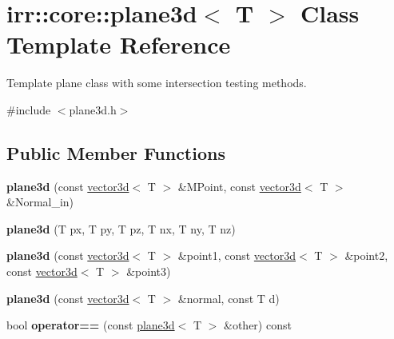\hypertarget{classirr_1_1core_1_1plane3d}{}\section{irr\+:\+:core\+:\+:plane3d$<$ T $>$ Class Template Reference}
\label{classirr_1_1core_1_1plane3d}


Template plane class with some intersection testing methods.  




{\ttfamily \#include $<$plane3d.\+h$>$}

\subsection*{Public Member Functions}
\begin{DoxyCompactItemize}
\item 
{\bfseries plane3d} (const \hyperlink{classirr_1_1core_1_1vector3d}{vector3d}$<$ T $>$ \&M\+Point, const \hyperlink{classirr_1_1core_1_1vector3d}{vector3d}$<$ T $>$ \&Normal\+\_\+in)\hypertarget{classirr_1_1core_1_1plane3d_a479bad81272248a153f9520be7b8da4c}{}\label{classirr_1_1core_1_1plane3d_a479bad81272248a153f9520be7b8da4c}

\item 
{\bfseries plane3d} (T px, T py, T pz, T nx, T ny, T nz)\hypertarget{classirr_1_1core_1_1plane3d_af754b386af5b0296a47d97f1c9e39d55}{}\label{classirr_1_1core_1_1plane3d_af754b386af5b0296a47d97f1c9e39d55}

\item 
{\bfseries plane3d} (const \hyperlink{classirr_1_1core_1_1vector3d}{vector3d}$<$ T $>$ \&point1, const \hyperlink{classirr_1_1core_1_1vector3d}{vector3d}$<$ T $>$ \&point2, const \hyperlink{classirr_1_1core_1_1vector3d}{vector3d}$<$ T $>$ \&point3)\hypertarget{classirr_1_1core_1_1plane3d_a79aa2659564f880e71db761516d91b9e}{}\label{classirr_1_1core_1_1plane3d_a79aa2659564f880e71db761516d91b9e}

\item 
{\bfseries plane3d} (const \hyperlink{classirr_1_1core_1_1vector3d}{vector3d}$<$ T $>$ \&normal, const T d)\hypertarget{classirr_1_1core_1_1plane3d_a3f3171c926e019c47e56e2eb0ba9a9bf}{}\label{classirr_1_1core_1_1plane3d_a3f3171c926e019c47e56e2eb0ba9a9bf}

\item 
bool {\bfseries operator==} (const \hyperlink{classirr_1_1core_1_1plane3d}{plane3d}$<$ T $>$ \&other) const \hypertarget{classirr_1_1core_1_1plane3d_a4ea013907b2e44c91cc9defacb7a8d53}{}\label{classirr_1_1core_1_1plane3d_a4ea013907b2e44c91cc9defacb7a8d53}


\end{DoxyCompactItemize}
